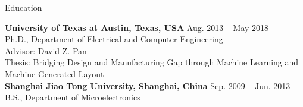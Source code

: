 

\begin{rSection}{Education}


{\bf University of Texas at Austin, Texas, USA} \hfill {Aug. 2013 -- May 2018} \\ 
Ph.D., Department of Electrical and Computer Engineering \\
Advisor: David Z. Pan \\
Thesis: Bridging Design and Manufacturing Gap through Machine Learning and Machine-Generated Layout \\

{\bf Shanghai Jiao Tong University, Shanghai, China} \hfill {Sep. 2009 -- Jun. 2013} \\ 
B.S., Department of Microelectronics \\

\end{rSection}

